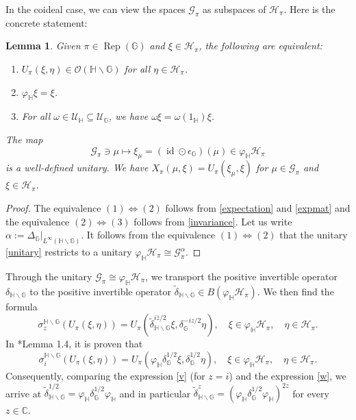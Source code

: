 \documentclass[reqno]{amsart}
\numberwithin{equation}{section}
\newtheorem{Lem}[Theorem]{Lemma}
\DeclareMathOperator{\id}{\mathrm{id}}
\DeclareMathOperator{\Rep}{\mathrm{Rep}}
\renewcommand{\H}{\mathbb{H}}
\newcommand{\mcG}{\mathcal{G}}
\newcommand{\mcH}{\mathcal{H}}
\newcommand{\mcO}{\mathcal{O}}
\newcommand{\C}{\mathbb{C}}
\newcommand{\G}{\mathbb{G}}
\begin{document}
In the coideal case, we can view the spaces $\mcG_\pi$ as subspaces of $\mcH_\pi$. Here is the concrete statement:
\begin{Lem} Given $\pi\in \Rep(\G)$ and $\xi \in \mcH_\pi$, the following are equivalent:
\begin{enumerate}
    \item $U_\pi(\xi, \eta)\in \mcO(\H\backslash \G)$ for all $\eta \in \mcH_\pi$.
    \item \vspace{-1.5mm}$\varphi_\H\xi = \xi$.
    \item \vspace{-1.5mm}For all $\omega \in \mathscr{U}_\H\subseteq \mathscr{U}_\G$, we have $\omega\xi= \omega(1_\H)\xi$.
\end{enumerate}
The map
    \begin{equation}\label{spectral spaces}
        \mcG_\pi\ni \mu \mapsto \xi_\mu = (\id \odot \epsilon_\G)(\mu)\in \varphi_\H \mcH_\pi
    \end{equation}
    is a well-defined unitary. We have $X_\pi(\mu, \xi) = U_\pi(\xi_\mu, \xi)$ for $\mu \in \mcG_\pi$ and $\xi \in \mcH_\pi$.
\end{Lem}
\begin{proof} The equivalence $(1)\iff (2)$ follows from \eqref{expectation} and \eqref{expmat} and the equivalence $(2)\iff (3)$ follows from \eqref{invariance}. Let us write $\alpha:= \Delta_\G\vert_{L^\infty(\H\backslash \G)}$. It follows from the equivalence $(1)\iff (2)$ that the unitary \eqref{unitary} restricts to a unitary $\varphi_\H \mcH_\pi \cong \mcG_\pi^\alpha$.
\end{proof}

Through the unitary $\mcG_\pi \cong \varphi_\H \mcH_\pi$, we transport the positive invertible operator $\delta_{\H\backslash \G}$ to the positive invertible operator $\tilde{\delta}_{\H\backslash \G} \in B(\varphi_\H \mcH_\pi)$. We then find the formula
\begin{equation}\label{v}
    \sigma_z^{\H\backslash \G}(U_\pi(\xi, \eta))= U_\pi(\tilde{\delta}_{\H\backslash \G}^{i\bar{z}/2}\xi, \delta_\G^{-iz/2}\eta), \quad \xi \in \varphi_\H \mcH_\pi, \quad \eta \in \mcH_\pi.
\end{equation}
In \cite{DCDT24}*{Lemma 1.4}, it is proven that 
\begin{equation}\label{w}
    \sigma^{\H\backslash \G}_{i}(U_\pi(\xi, \eta))= U_\pi(\varphi_\H \delta_\G^{1/2} \xi, \delta_\G^{1/2}\eta), \quad \xi \in \varphi_\H \mcH_\pi, \quad \eta \in \mcH_\pi.
\end{equation}
Consequently, comparing the expression \eqref{v} (for $z= i$) and the expression \eqref{w}, we arrive at $\tilde{\delta}_{\H\backslash \G}^{1/2} = \varphi_\H \delta_\G^{1/2}\varphi_\H$ and in particular 
$\tilde{\delta}_{\H\backslash \G}^{z}= (\varphi_\H \delta_\G^{1/2} \varphi_\H)^{2z}$ for every $z\in \C$.
\end{document}
